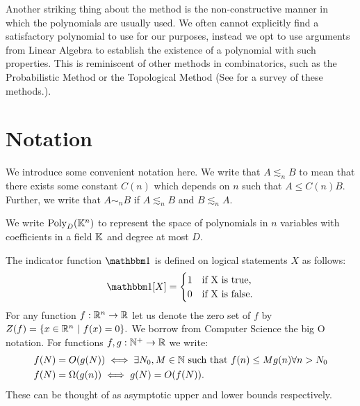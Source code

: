 Another striking thing about the method is the non-constructive manner in which the polynomials are usually used. 
We often cannot explicitly find a satisfactory polynomial to use for our purposes, instead we opt to use arguments from Linear Algebra to establish the
existence of a polynomial with such properties. This is reminiscent of other methods in combinatorics, such as the Probabilistic Method or the Topological Method (See \cite{ALON2003} for a survey of these methods.). 

\section{Notation}
We introduce some convenient notation here. We write that $A \lesssim_n B$ to mean that there exists some constant
$C(n)$ which depends on $n$ such that $A \leq C(n) B$. Further, we write that $A \sim_n B$ if $A \lesssim_n B$ and $B \lesssim_n A$.

We write $\text{Poly}_D (\mathbb K^n)$ to represent the space of polynomials in $n$ variables with coefficients in a field $\mathbb K$ and degree at most $D$.

The indicator function $\OO$ is defined on logical statements $X$ as follows:
\[
    \OO[X] = 
  \begin{cases}
      1 & \text{if X is true}, \\
      0 & \text{if X is false}.
  \end{cases}  
\]
For any function $f : \mathbb R^n \to \mathbb R$ let us denote the zero set of $f$ by $Z(f) = \{x \in \mathbb R^n \ | \ f(x) = 0\}.$
We borrow from Computer Science the big O notation. For functions $f,g : \mathbb N^+ \to \mathbb R$ we write:
\begin{align*}
    f(N) &= O(g(N)) \iff \exists N_0, M \in \mathbb N \text{ such that } f(n) \leq Mg(n) \forall n > N_0 \\
    f(N) &= \Omega(g(n)) \iff g(N) = O(f(N)).
\end{align*}
These can be thought of as asymptotic upper and lower bounds respectively.